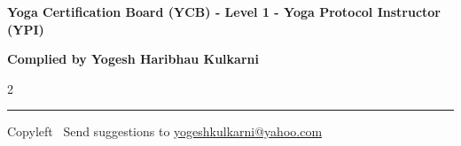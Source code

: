 \documentclass[9pt,a4paper,landscape]{article}
\begin{document}
\footnotesize

\thispagestyle{empty}  %

\thispagestyle{fancy} 

\begin{center}
\Large{\textbf{Yoga Certification Board (YCB) - Level 1 - Yoga Protocol Instructor (YPI)}}

\large{\textbf{Complied by Yogesh Haribhau Kulkarni}}
\end{center}


\begin{multicols}{2}

\end{multicols}

\rule{\linewidth}{0.25pt}
\scriptsize
Copyleft \textcopyleft\  Send suggestions to 
\href{http://www.yogeshkulkarni.com}{yogeshkulkarni@yahoo.com}


\end{document}
